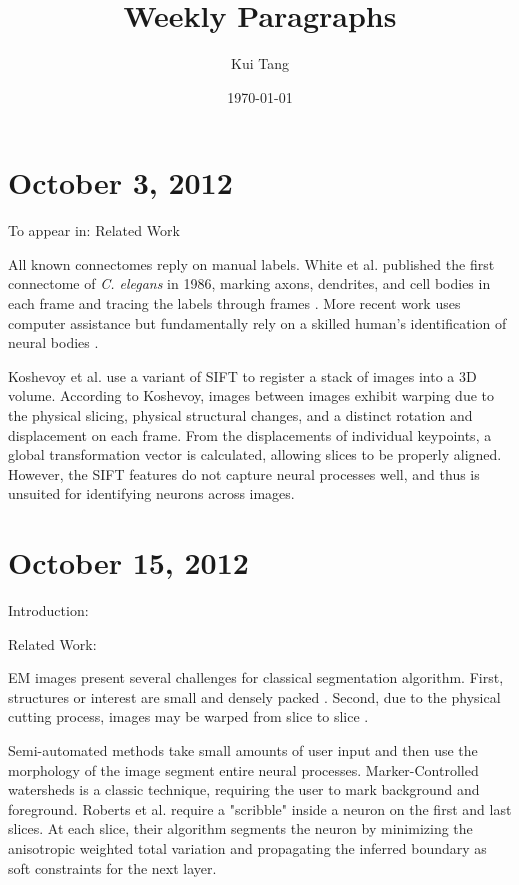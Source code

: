 \documentclass{article}
\begin{document}
\title{Weekly Paragraphs}
\author{Kui Tang}
\date{\today}
\maketitle
\section*{October 3, 2012}
To appear in: Related Work

All known connectomes reply on manual labels. White et al. published the first connectome of \emph{C. elegans} in 1986, marking axons, dendrites, and cell bodies in each frame and tracing the labels through frames \cite{White12111986}. More recent work uses computer assistance but fundamentally rely on a skilled human's identification of neural bodies \cite{Jarrell2012,Bock2011Roberts2011}.

Koshevoy et al. \cite{Koshevoy2006} use a variant of SIFT \cite{Lowe2004} to register a stack of images into a 3D volume. According to Koshevoy, images between images exhibit warping due to the physical slicing, physical structural changes, and a distinct rotation and displacement on each frame. From the displacements of individual keypoints, a global transformation vector is calculated, allowing slices to be properly aligned. However, the SIFT features do not capture neural processes well, and thus is unsuited for identifying neurons across images.

\section*{October 15, 2012}
Introduction:

Related Work:

EM images present several challenges for classical segmentation algorithm. First, structures or interest are small and densely packed \cite{Jain2007}. Second, due to the physical cutting process, images may be warped from slice to slice \cite{Koshevoy2006}.

Semi-automated methods take small amounts of user input and then use the morphology of the image segment entire neural processes. Marker-Controlled watersheds \cite{Gonzales2008} is a classic technique, requiring the user to mark background and foreground. Roberts et al. \cite{Roberts2011} require a "scribble" inside a neuron on the first and last slices. At each slice, their algorithm segments the neuron by minimizing the anisotropic weighted total variation \cite{Unger2009} and propagating the inferred boundary as soft constraints for the next layer.
\end{document}
